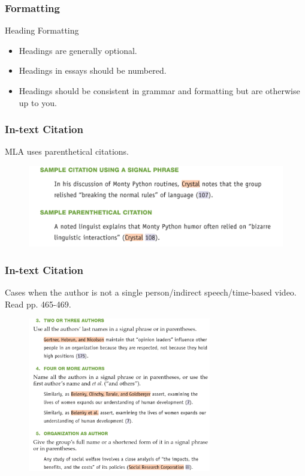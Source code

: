 \documentclass{beamer}
\begin{document}
\begin{frame}
\frametitle{Formatting}
\begin{block}{Heading Formatting}
\begin{itemize}
\item Headings are generally optional.
\item Headings in essays should be numbered.
\item Headings should be consistent in grammar and formatting but are otherwise up to you.
\end{itemize}
\end{block}
\end{frame}
\begin{frame}
\frametitle{In-text Citation}
MLA uses parenthetical citations.
\begin{figure}[!htbp]
\center
\includegraphics[width=12cm]{intext.png}
\end{figure}
\end{frame}
\begin{frame}
\frametitle{In-text Citation}
Cases when the author is not a single person/indirect speech/time-based video. Read pp. 465-469.
\begin{figure}[!htbp]
\center
\includegraphics[width=8cm]{author1.png}
\end{figure}
\end{frame}
\end{document}
